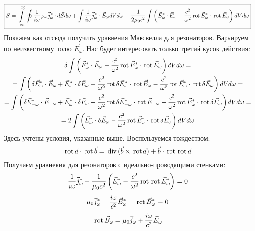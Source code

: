 \[
\boxed{
	S = \int\limits_{-\infty}^{\infty}\oint \frac{1}{i\omega} \varphi_\omega \vec{j}^*_\omega \cdot d\vec{S} d\omega +
	\int \frac{1}{i\omega}  \vec{j}^*_\omega \cdot \vec{E}_\omega dV d\omega - \frac{1}{2\mu_0c^2} \int \left(\vec{E}^*_\omega\cdot\vec{E}_\omega - \frac{c^2}{\omega^2} \,\mathrm{rot}\,\vec{E}^*_\omega \cdot \,\mathrm{rot}\,\vec{E}_\omega\right) dV d\omega
}
\]
Покажем как отсюда получить уравнения Максвелла для резонаторов. Варьируем по неизвестному полю $\vec{E}_\omega$. Нас будет интересовать только третий кусок действия:
\[
	\begin{gathered}
	\delta \int \left(\vec{E}^*_\omega\cdot\vec{E}_\omega - \frac{c^2}{\omega^2} \,\mathrm{rot}\,\vec{E}^*_\omega \cdot \,\mathrm{rot}\,\vec{E}_\omega\right) dV d\omega 
	= \\ =
	\int \left(\delta\vec{E}^*_\omega\cdot\vec{E}_\omega + \vec{E}^*_\omega\cdot\delta\vec{E}_\omega - \frac{c^2}{\omega^2} \,\mathrm{rot}\,\delta \vec{E}^*_\omega \cdot \,\mathrm{rot}\,\vec{E}_\omega - \frac{c^2}{\omega^2} \,\mathrm{rot}\, \vec{E}^*_\omega \cdot \,\mathrm{rot}\,\delta\vec{E}_\omega \right) dV d\omega
	= \\ =
	\int \left(\delta\vec{E}^*_{-\omega}\cdot\vec{E}_{-\omega} + \vec{E}^*_\omega\cdot\delta\vec{E}_\omega - \frac{c^2}{\omega^2} \,\mathrm{rot}\,\delta \vec{E}^*_{-\omega} \cdot \,\mathrm{rot}\,\vec{E}_{-\omega} - \frac{c^2}{\omega^2} \,\mathrm{rot}\, \vec{E}^*_\omega \cdot \,\mathrm{rot}\,\delta\vec{E}_\omega \right) dV d\omega
	= \\ =
	2 \int \left(\vec{E}^*_\omega\cdot\delta\vec{E}_\omega - \frac{c^2}{\omega^2} \,\mathrm{rot}\, \vec{E}^*_\omega \cdot \,\mathrm{rot}\,\delta\vec{E}_\omega \right) dV d\omega
	\end{gathered}
\]
Здесь учтены условия, указанные выше. Воспользуемся тождеством:
\[
	\,\mathrm{rot}\, \vec{a} \cdot \,\mathrm{rot}\, \vec{b} = \,\mathrm{div}\, (\vec{b} \times \,\mathrm{rot}\, \vec{a}) + \vec{b} \cdot \,\mathrm{rot}\, \,\mathrm{rot}\, \vec{a}
\]
Получаем уравнения для резонаторов с идеально-проводящими стенками:
\[
	\frac{1}{i\omega} \vec{j}^*_\omega - \frac{1}{\mu_0 c^2} \left(\vec{E}^*_\omega - \frac{c^2}{\omega^2} \,\mathrm{rot}\,\,\mathrm{rot}\,\vec{E}^*_\omega \right) = 0
\]
\[
	\mu_0 \vec{j}^*_\omega - \frac{i\omega}{c^2} \vec{E}^*_\omega - \,\mathrm{rot}\,\vec{B}^*_\omega = 0
\]
\[
	 \,\mathrm{rot}\,\vec{B}_\omega = \mu_0 \vec{j}_\omega + \frac{i\omega}{c^2} \vec{E}_\omega
\]